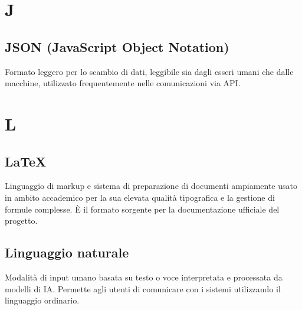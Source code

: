 \documentclass[a4paper, 11pt, oneside]{scrartcl} %
\begin{document}
\vspace{0.5cm}



\section*{J}


\subsection*{JSON (JavaScript Object Notation)}
Formato leggero per lo scambio di dati, leggibile sia dagli esseri umani che dalle macchine, utilizzato frequentemente nelle comunicazioni via API.
\vspace{0.5cm}



\section*{L}


\subsection*{LaTeX}


Linguaggio di markup e sistema di preparazione di documenti ampiamente usato in ambito accademico per la sua elevata qualità tipografica e la gestione di formule complesse. È il formato sorgente per la documentazione ufficiale del progetto.

\vspace{0.5cm}

\subsection*{Linguaggio naturale}


Modalità di input umano basata su testo o voce interpretata e processata da modelli di IA. Permette agli utenti di comunicare con i sistemi utilizzando il linguaggio ordinario.

\vspace{0.5cm}
\end{document}
